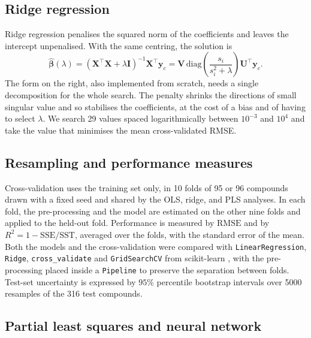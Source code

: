 \documentclass[conference]{IEEEtran}
\begin{document}
\subsection{Ridge regression}
\label{subsec:ridge}

Ridge regression \cite{hoerl1970} penalises the squared norm of the
coefficients and leaves the intercept unpenalised. With the same
centring, the solution is
\begin{equation}
\hat{\boldsymbol{\beta}}(\lambda) =
(\mathbf{X}^{\top}\mathbf{X} + \lambda\mathbf{I})^{-1}
\mathbf{X}^{\top}\mathbf{y}_c =
\mathbf{V}\,\mathrm{diag}\!\left(\frac{s_i}{s_i^{2}+\lambda}\right)
\mathbf{U}^{\top}\mathbf{y}_c.
\label{eq:ridge}
\end{equation}
The form on the right, also implemented from scratch, needs a single
decomposition for the whole search. The penalty shrinks the directions
of small singular value and so stabilises the coefficients, at the cost
of a bias and of having to select $\lambda$. We search 29 values spaced
logarithmically between $10^{-3}$ and $10^{4}$ and take the value that
minimises the mean cross-validated RMSE.

\subsection{Resampling and performance measures}
\label{subsec:cv}

Cross-validation uses the training set only, in 10 folds of 95 or 96
compounds drawn with a fixed seed and shared by the OLS, ridge, and PLS
analyses. In each fold, the pre-processing and the model are estimated
on the other nine folds and applied to the held-out fold. Performance
is measured by $\mathrm{RMSE}$ and by
$R^2 = 1 - \mathrm{SSE}/\mathrm{SST}$, averaged over the folds, with
the standard error of the mean. Both the models and the cross-validation
were compared with \texttt{LinearRegression}, \texttt{Ridge},
\texttt{cross\_validate} and \texttt{GridSearchCV} from scikit-learn
\cite{pedregosa2011}, with the pre-processing placed inside a
\texttt{Pipeline} to preserve the separation between folds. Test-set
uncertainty is expressed by $95\%$ percentile bootstrap intervals
\cite{efron1993} over 5000 resamples of the 316 test compounds.

\subsection{Partial least squares and neural network}
\label{subsec:pls-nn}
\end{document}
